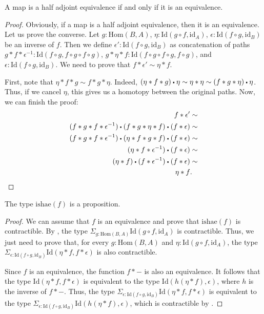 \documentclass[reqno]{mscs}
\newcommand{\fs}[1]{\mathrm{#1}}
\newcommand{\Hom}{\fs{Hom}}
\newcommand{\Id}{\fs{Id}}
\newcommand{\sym}[1]{#1^{-1}}
\newcommand{\id}{\fs{id}}
\numberwithin{figure}{section}
\newcommand{\ct}{%
  \mathchoice{\mathbin{\raisebox{0.25ex}{$\displaystyle\centerdot$}}}%
             {\mathbin{\raisebox{0.25ex}{$\centerdot$}}}%
             {\mathbin{\raisebox{0.25ex}{$\scriptstyle\,\centerdot\,$}}}%
             {\mathbin{\raisebox{0.25ex}{$\scriptscriptstyle\,\centerdot\,$}}}
}
\begin{document}
\begin{prop}
A map is a half adjoint equivalence if and only if it is an equivalence.
\end{prop}
\begin{proof}
Obviously, if a map is a half adjoint equivalence, then it is an equivalence.
Let us prove the converse.
Let $g : \Hom(B,A)$, $\eta : \Id(g \circ f, \id_A)$, $\epsilon : \Id(f \circ g, \id_B)$ be an inverse of $f$.
Then we define $\epsilon' : \Id(f \circ g, \id_B)$ as concatenation of paths
$g * f * \sym{\epsilon} : \Id(f \circ g, f \circ g \circ f \circ g)$, $g * \eta * f : \Id(f \circ g \circ f \circ g, f \circ g)$, and $\epsilon : \Id(f \circ g, \id_B)$.
We need to prove that $f * \epsilon' \sim \eta * f$.

First, note that $\eta * f * g \sim f * g * \eta$.
Indeed, $(\eta * f * g) \ct \eta \sim \eta * \eta \sim (f * g * \eta) \ct \eta$.
Thus, if we cancel $\eta$, this gives us a homotopy between the original paths.
Now, we can finish the proof:
\begin{align*}
f * \epsilon' & \sim \\
(f * g * f * \sym{\epsilon}) \ct (f * g * \eta * f) \ct (f * \epsilon) & \sim \\
(f * g * f * \sym{\epsilon}) \ct (\eta * f * g * f) \ct (f * \epsilon) & \sim \\
(\eta * f * \sym{\epsilon}) \ct (f * \epsilon) & \sim \\
(\eta * f) \ct (f * \sym{\epsilon}) \ct (f * \epsilon) & \sim \\
\eta * f & .
\end{align*}
\end{proof}

\begin{prop}
The type $\fs{ishae}(f)$ is a proposition.
\end{prop}
\begin{proof}
We can assume that $f$ is an equivalence and prove that $\fs{ishae}(f)$ is contractible.
By , the type $\Sigma_{g : \Hom(B,A)} \Id(g \circ f, \id_A)$ is contractible.
Thus, we just need to prove that, for every $g : \Hom(B,A)$ and $\eta : \Id(g \circ f, \id_A)$, the type $\Sigma_{\epsilon : \Id(f \circ g, \id_B)} \Id(\eta * f, f * \epsilon)$ is also contractible.

Since $f$ is an equivalence, the function $f * -$ is also an equivalence.
It follows that the type $\Id(\eta * f, f * \epsilon)$ is equivalent to the type $\Id(h(\eta * f), \epsilon)$, where $h$ is the inverse of $f * -$.
Thus, the type $\Sigma_{\epsilon : \Id(f \circ g, \id_B)} \Id(\eta * f, f * \epsilon)$ is equivalent to the type $\Sigma_{\epsilon : \Id(f \circ g, \id_B)} \Id(h(\eta * f), \epsilon)$, which is contractible by \cite[Lemma~3.11.8]{hottbook}.
\end{proof}
\end{document}
